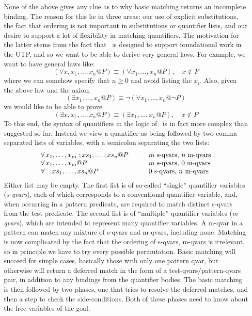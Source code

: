 None of the above gives any clue as to why basic matching
returns an incomplete binding.
The reason for this lie in three areas: our use of
explicit substitutions, the fact that ordering is not important
in substitutions or quantifier lists,
and our desire to support a lot of flexibility in matching quantifiers.
The motivation for the latter stems from the fact that \STHN\ is designed
to support foundational work in the UTP,
and so we want to be able to derive very general laws.
For example, we want to have general laws like:
$$
  (\forall x,x_1,\ldots,x_n @ P )
  \equiv
  (\forall x_1,\ldots,x_n @ P ), \quad x \notin P
$$
where we can somehow specify that $n \geq 0$ and avoid listing the $x_i$.
Also, given the above law
and the axiom
$$
  (\exists x_1,\ldots,x_n @ P)
  \equiv
  \lnot (\forall x_1,\ldots,x_n @ \lnot P )
$$
we would like to be able to prove
$$
  (\exists x,x_1,\ldots,x_n @ P )
  \equiv
  (\exists x_1,\ldots,x_n @ P ), \quad x \notin P
$$
To this end, the syntax of quantifiers in the logic of \STHN\ is in fact
more complex than suggested so far.
Instead we view a quantifier as being followed by
two comma-separated lists of variables,
with a semicolon separating the two lists:
  $$\begin{array}{lc@{\qquad}l}
     \forall x_1,\ldots,x_m~; xs_1,\ldots,xs_n @ P
     && m \mbox{ s-qvars, } n \mbox{ m-qvars}
  \\ \forall x_1,\ldots,x_m @ P
     && m \mbox{ s-qvars, } 0 \mbox{ m-qvars}
  \\ \forall ~~;xs_1,\ldots,xs_n @ P
     && 0 \mbox{ s-qvars, } n \mbox{ m-qvars}
  \end{array}$$
Either list may be empty.
The first list is of so-called ``single'' quantifier variables (\emph{s-qvars}),
each of which corresponds to a conventional quantifier variable,
and, when occurring in a pattern predicate, are required to match
distinct s-qvars from the test predicate.
The second list is of ``multiple'' quantifier variables (\emph{m-qvars}),
which are intended to represent many quantifier variables.
A m-qvar in a pattern can match any mixture of s-qvars and m-qvars,
including none.
Matching is now complicated by the fact that the ordering
of s-qvars, m-qvars  is irrelevant,
so in principle we have to try every possible permutation.
Basic matching  will succeed for simple cases, basically
those with only one pattern qvar,
but otherwise will return a deferred match in the form of
a test-qvars/pattern-qvars pair,
in addition to any bindings
from the quantifier bodies.
The basic matching is then followed by two phases,
one that tries to resolve the deferred matches,
and then a step to check the side-conditions.
Both of these phases need to know about the free variables of the goal.

